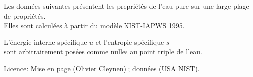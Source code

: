 \begin{center}
	Les données suivantes présentent les propriétés de l’eau pure sur une large plage de propriétés.\\
	Elles sont calculées à partir du modèle NIST-IAPWS 1995.

	L’énergie interne spécifique $u$ et l’entropie spécifique $s$ \\
	sont arbitrairement posées comme nulles au point triple de l’eau.

	Licence: Mise en page \cczero (Olivier Cleynen) ; données \pd (USA NIST).
\end{center}
